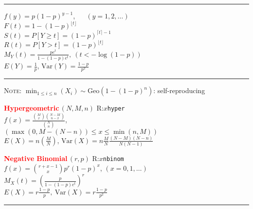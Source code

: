 \documentclass[10pt]{article}
\newenvironment{LIST}[1]{\begin{list}{}
                          { \settowidth{\labelwidth}{#1}
                            \setlength{\leftmargin}{\labelwidth}
                            \addtolength{\leftmargin}{\labelsep}
                            \setlength{\parsep}{0.5ex plus0.2ex minus0.2ex}
                            \setlength{\itemsep}{0ex plus0.2ex}
                            \renewcommand{\makelabel}[1]{##1\hfill}
                          }
                        }
                        {\end{list}}
\begin{document}
\begin{multicols}{2}
\begin{small}
\begin{enumerate}
      {\textcolor{red}{\rule{0.43\textwidth}{0.5pt}}}   %

      $f(y)=p(1-p)^{y-1}$, ~~ $(y=1,2,\ldots)$  \\
      $F(t)=1-(1-p)^{\lfloor t\rfloor}$ \\
      $S(t)=P[Y\ge t] = (1-p)^{\lceil t\rceil - 1}$ \\  
      $R(t)=P[Y >  t] = (1-p)^{\lfloor t\rfloor}$ \\  
      $M_Y(t)=\displaystyle\frac{pe^t}{1-(1-p)e^t}, ~ ( t<-\log (1-p) )$\\
      $E(Y)= \displaystyle\frac{1}{p}$, $\textrm{Var}(Y)=\displaystyle\frac{1-p}{p^2}$ 

      {\textcolor{red}{\rule{0.43\textwidth}{0.5pt}}}   %

      \vspace{-2ex}
      \begin{LIST}{\textsc{Note:}}
      \item[\textsc{Note:}] 
  $\displaystyle\min_{1\le i\le n}(X_i) \sim \textrm{Geo}\left(1-(1-p)^n\right)$: 
                    self-reproducing
      \end{LIST}
\item \textcolor{red}{\bfseries\textsf{Hypergeometric}}\,$(N,M,n)$  \hfill \textsf{R:}$x$\texttt{\color{red}hyper} \\
      $f(x)=\displaystyle\frac{\binom{M}{x}\binom{N-M}{n-x}}{\binom{N}{n}}$,\\
              \hspace*{\fill}$(\max(0,M-(N-n)) \le x \le \min(n,M))$\\
      $E(X)=n \left(\displaystyle\frac{M}{N}\right)$,
                  $\textrm{Var}(X) = n\displaystyle\frac{M}{N}\frac{(N-M)(N-n)}{N (N-1)}$
\item \textcolor{red}{\bfseries\textsf{Negative Binomial}}\,$(r,p)$   \hfill \textsf{R:}$x$\texttt{\color{red}nbinom} \\
      $f(x)= \binom{r+x-1}{x} p^r (1-p)^x$, $(x=0,1,\ldots)$\\
      $M_X(t)=\left( \frac{\displaystyle p}{\displaystyle 1-(1-p)e^t} \right)^r$ \\
      $E(X) = r \frac{1-p}{p}, ~\textrm{Var}(X) = r \frac{1-p}{p^2} $ 

      {\textcolor{red}{\rule{0.43\textwidth}{0.5pt}}}   %


\end{enumerate}
\end{small}
\end{multicols}
\end{document}
